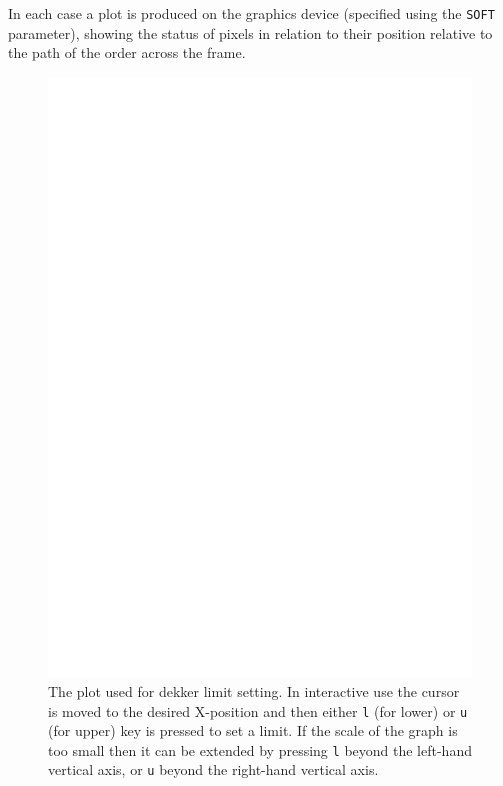 \documentclass[twoside,11pt]{article}
\renewcommand{\_}{\texttt{\symbol{95}}}
\newcommand{\sunspec}[2]{#1}
\newcommand{\sunspec}[2]{#2}
\begin{document}
In each case a plot is produced on the graphics device (specified using
the \texttt{SOFT} parameter), showing the status of pixels in relation to their
position relative to the path of the order across the frame.

\begin{figure}
\begin{center}
\includegraphics[width=\textwidth]{sun152_04.eps}

\parbox{140mm}{
\caption{The plot used for dekker limit setting. In interactive use
the cursor is moved to the desired X-position and then either {\tt l}
(for lower) or {\tt u} (for upper) key is pressed to set a limit. If
the scale of the graph is too small then it can be extended by
pressing {\tt l} beyond the left-hand vertical axis, or {\tt u}
beyond the right-hand vertical axis.}
\label{fi_dekker}
}
\end{center}
\end{figure}
\end{document}
